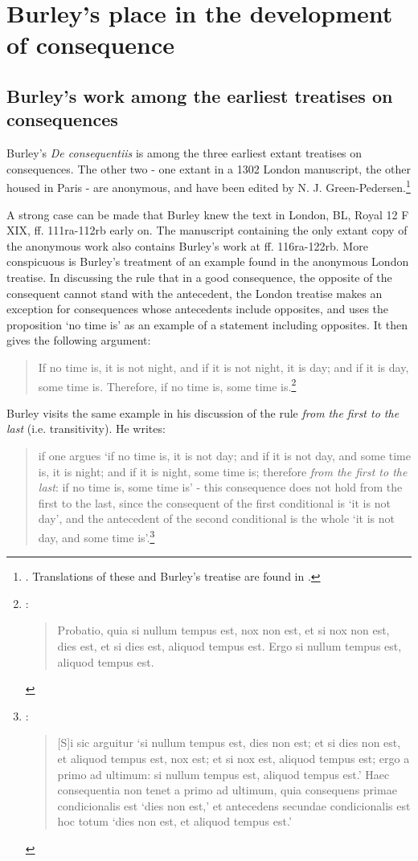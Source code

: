 \documentclass[]{birkjour}
\begin{document}
\section{Burley's place in the development of consequence}
\subsection{Burley's work among the earliest treatises on consequences}
Burley's \textit{De consequentiis} is among the three earliest extant treatises on consequences. The other two - one extant in a 1302 London manuscript, the other housed in Paris - are anonymous, and have been edited by N. J. Green-Pedersen.\footnote{\autocite{Green-Pedersen1980a}. Translations of these and Burley's treatise are found in \autocite{Archambault2017d}.}

A strong case can be made that Burley knew the text in London, BL, Royal 12 F XIX, ff. 111ra-112rb early on. The manuscript containing the only extant copy of the anonymous work also contains Burley's work at ff. 116ra-122rb. More conspicuous is Burley's treatment of an example found in the anonymous London treatise. In discussing the rule that in a good consequence, the opposite of the consequent cannot stand with the antecedent, the London treatise makes an exception for consequences whose antecedents include opposites, and uses the proposition `no time is' as an example of a statement including opposites. It then gives the following argument:
\begin{quote}
	If no time is, it is not night, and if it is not night, it is day; and if it is day, some time is. Therefore, if no time is, some time is.\footnote{\autocite[p. 7, par. 18]{Green-Pedersen1980a}: 
		\begin{quote}
			Probatio, quia si nullum tempus est, nox non est, et si nox non est, dies est, et si dies est, aliquod tempus est. Ergo si nullum tempus est, aliquod tempus est.
		\end{quote}}
\end{quote}
Burley visits the same example in his discussion of the rule \textit{from the first to the last} (i.e. transitivity). He writes: 
\begin{quote}
	if one argues `if no time is, it is not day; and if it is not day, and some time is, it is night; and if it is night, some time is; therefore \textit{from the first to the last}: if no time is, some time is' - this consequence does not hold from the first to the last, since the consequent of the first conditional is `it is not day', and the antecedent of the second conditional is the whole `it is not day, and some time is'.\footnote{\autocite[pp. 114-115, par 8]{Green-Pedersen1980b}: \begin{quote}
			[S]i sic arguitur `si nullum tempus est, dies non est; et si dies non est, et aliquod tempus est, nox est; et si nox est, aliquod tempus est; ergo a primo ad ultimum: si nullum tempus est, aliquod tempus est.' Haec consequentia non tenet a primo ad ultimum, quia consequens primae condicionalis est `dies non est,' et antecedens secundae condicionalis est hoc totum `dies non est, et aliquod tempus est.'
		\end{quote}}
\end{quote}
\end{document}
